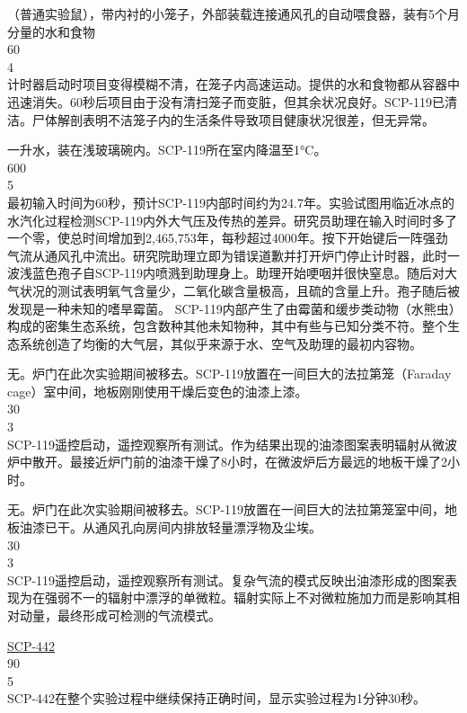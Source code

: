 \begin{scpbox}
（普通实验鼠），带内衬的小笼子，外部装载连接通风孔的自动喂食器，装有5个月分量的水和食物\\
60\\
4\\
计时器启动时项目变得模糊不清，在笼子内高速运动。提供的水和食物都从容器中迅速消失。60秒后项目由于没有清扫笼子而变脏，但其余状况良好。SCP-119已清洁。尸体解剖表明不洁笼子内的生活条件导致项目健康状况很差，但无异常。

一升水，装在浅玻璃碗内。SCP-119所在室内降温至1°C。\\
600\\
5\\
最初输入时间为60秒，预计SCP-119内部时间约为24.7年。实验试图用临近冰点的水汽化过程检测SCP-119内外大气压及传热的差异。研究员助理在输入时间时多了一个零，使总时间增加到2,465,753年，每秒超过4000年。按下开始键后一阵强劲气流从通风孔中流出。研究院助理立即为错误道歉并打开炉门停止计时器，此时一波浅蓝色孢子自SCP-119内喷溅到助理身上。助理开始哽咽并很快窒息。随后对大气状况的测试表明氧气含量少，二氧化碳含量极高，且硫的含量上升。孢子随后被发现是一种未知的嗜旱霉菌。 SCP-119内部产生了由霉菌和缓步类动物（水熊虫）构成的密集生态系统，包含数种其他未知物种，其中有些与已知分类不符。整个生态系统创造了均衡的大气层，其似乎来源于水、空气及助理的最初内容物。


无。炉门在此次实验期间被移去。SCP-119放置在一间巨大的法拉第笼（Faraday cage）室中间，地板刚刚使用干燥后变色的油漆上漆。\\
30\\
3\\
 SCP-119遥控启动，遥控观察所有测试。作为结果出现的油漆图案表明辐射从微波炉中散开。最接近炉门前的油漆干燥了8小时，在微波炉后方最远的地板干燥了2小时。

无。炉门在此次实验期间被移去。SCP-119放置在一间巨大的法拉第笼室中间，地板油漆已干。从通风孔向房间内排放轻量漂浮物及尘埃。\\
30\\
3\\
 SCP-119遥控启动，遥控观察所有测试。复杂气流的模式反映出油漆形成的图案表现为在强弱不一的辐射中漂浮的单微粒。辐射实际上不对微粒施加力而是影响其相对动量，最终形成可检测的气流模式。

\hyperref[chap:SCP-442]{SCP-442}\\
90\\
5\\
SCP-442在整个实验过程中继续保持正确时间，显示实验过程为1分钟30秒。


\end{scpbox}
